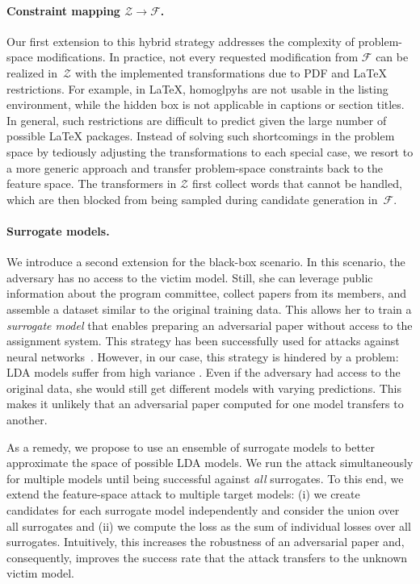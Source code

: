 \documentclass[letterpaper,twocolumn,10pt]{article}
\newcommand{\Dom}{\ensuremath{\mathcal{Z}}\xspace}
\newcommand{\F}{\ensuremath{\mathcal{F}}\xspace}
\begin{document}
\paragraph{Constraint mapping $\Dom \rightarrow \F$.}
Our first extension to this hybrid strategy addresses the complexity of problem-space modifications. In practice, not every requested modification from \F can be realized in~\Dom with the implemented transformations due to PDF and \LaTeX{} restrictions.
For example, in \LaTeX{}, homoglpyhs are not usable in the listing environment, while the hidden box is not applicable in captions or section titles. In general, such restrictions are difficult to predict given the large number of possible \LaTeX{} packages.
Instead of solving such shortcomings in the problem space by tediously adjusting the transformations to each special case, we resort to a more generic approach and transfer problem-space constraints back to the feature space. 
The transformers in \Dom first collect words that cannot be handled, which are then blocked from being sampled during candidate generation in~\F.

\paragraph{Surrogate models.}
We introduce a second extension for the black-box scenario. 
In this scenario, the adversary has no access to the victim model. Still, she can leverage public information about the program committee, collect papers from its members, and assemble a dataset similar to the original training data. This allows her to train a \emph{surrogate model} that enables preparing an adversarial paper without access to the assignment system. This strategy has been successfully used for attacks against neural networks~\cite{papernot-16-transferability}.
However, in our case, this strategy is hindered by a problem: LDA models suffer from high variance \cite{agrawal-18-what, mantyla-18-measuring}. Even if the adversary had access to the original data, she would still get different models with varying predictions. This makes it unlikely that an adversarial paper computed for one model transfers to another. 

As a remedy, we propose to use an ensemble of surrogate models to better approximate the space of possible LDA models. 
We run the attack simultaneously for multiple models until being successful against \emph{all} surrogates. To this end, we extend the feature-space attack to multiple target models: (i) we create candidates for each surrogate model independently and consider the union over all surrogates and (ii) we compute the loss as the sum of individual losses over all surrogates. 
Intuitively, this increases the robustness of an adversarial paper and, consequently, improves the success rate that the attack transfers to the unknown victim model. 
 \vspace{-0.25em}
\end{document}
